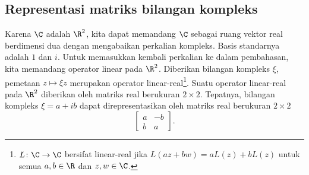 
\subsection{Representasi matriks bilangan kompleks}

Karena $\C$ adalah $\R^2$, kita dapat memandang
$\C$ sebagai ruang vektor real berdimensi dua dengan mengabaikan perkalian
kompleks.
Basis standarnya adalah $1$ dan $i$.
Untuk memasukkan kembali perkalian ke dalam pembahasan, kita memandang
operator linear pada $\R^2$.
Diberikan bilangan kompleks $\xi$, pemetaan $z \mapsto \xi z$ merupakan
operator linear-real\footnote{$L \colon \C \to \C$ bersifat linear-real jika
$L(a z + b w) = aL(z)+bL(z)$ untuk semua $a,b \in \R$ dan $z,w \in \C$.}.
Suatu operator linear-real pada $\R^2$ diberikan oleh matriks real
berukuran $2 \times 2$.
Tepatnya, bilangan kompleks $\xi = a+ib$ dapat direpresentasikan oleh matriks
real berukuran $2 \times 2$
\begin{equation} \label{eq:complexnumbermatrix}
\begin{bmatrix}
a & -b \\
b & a
\end{bmatrix} .
\end{equation}
